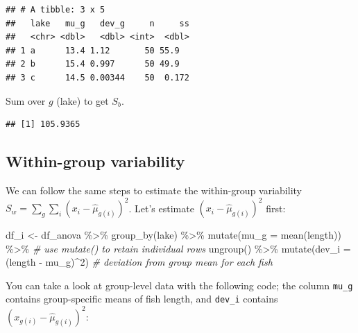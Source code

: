 \documentclass[
]{book}
\newenvironment{Shaded}{\begin{snugshade}}{\end{snugshade}}
\newcommand{\AttributeTok}[1]{\textcolor[rgb]{0.77,0.63,0.00}{#1}}
\newcommand{\CommentTok}[1]{\textcolor[rgb]{0.56,0.35,0.01}{\textit{#1}}}
\newcommand{\DecValTok}[1]{\textcolor[rgb]{0.00,0.00,0.81}{#1}}
\newcommand{\FunctionTok}[1]{\textcolor[rgb]{0.00,0.00,0.00}{#1}}
\newcommand{\NormalTok}[1]{#1}
\newcommand{\OtherTok}[1]{\textcolor[rgb]{0.56,0.35,0.01}{#1}}
\newcommand{\SpecialCharTok}[1]{\textcolor[rgb]{0.00,0.00,0.00}{#1}}
\begin{document}
\begin{verbatim}
## # A tibble: 3 x 5
##   lake   mu_g   dev_g     n     ss
##   <chr> <dbl>   <dbl> <int>  <dbl>
## 1 a      13.4 1.12       50 55.9  
## 2 b      15.4 0.997      50 49.9  
## 3 c      14.5 0.00344    50  0.172
\end{verbatim}

Sum over \(g\) (lake) to get \(S_b\).

\begin{Shaded}
\end{Shaded}

\begin{verbatim}
## [1] 105.9365
\end{verbatim}

\hypertarget{within-group-variability}{%
\subsection{Within-group variability}\label{within-group-variability}}

We can follow the same steps to estimate the within-group variability \(S_w = \sum_g \sum_i (x_{i} - \hat{\mu}_{g(i)})^2\). Let's estimate \((x_{i} - \hat{\mu}_{g(i)})^2\) first:

\begin{Shaded}
\begin{Highlighting}[]
\NormalTok{df\_i }\OtherTok{\textless{}{-}}\NormalTok{ df\_anova }\SpecialCharTok{\%\textgreater{}\%} 
  \FunctionTok{group\_by}\NormalTok{(lake) }\SpecialCharTok{\%\textgreater{}\%} 
  \FunctionTok{mutate}\NormalTok{(}\AttributeTok{mu\_g =} \FunctionTok{mean}\NormalTok{(length)) }\SpecialCharTok{\%\textgreater{}\%} \CommentTok{\# use mutate() to retain individual rows}
  \FunctionTok{ungroup}\NormalTok{() }\SpecialCharTok{\%\textgreater{}\%} 
  \FunctionTok{mutate}\NormalTok{(}\AttributeTok{dev\_i =}\NormalTok{ (length }\SpecialCharTok{{-}}\NormalTok{ mu\_g)}\SpecialCharTok{\^{}}\DecValTok{2}\NormalTok{) }\CommentTok{\# deviation from group mean for each fish}
\end{Highlighting}
\end{Shaded}

You can take a look at group-level data with the following code; the column \texttt{mu\_g} contains group-specific means of fish length, and \texttt{dev\_i} contains \((x_{g(i)} - \hat{\mu}_{g(i)})^2\):
\end{document}

